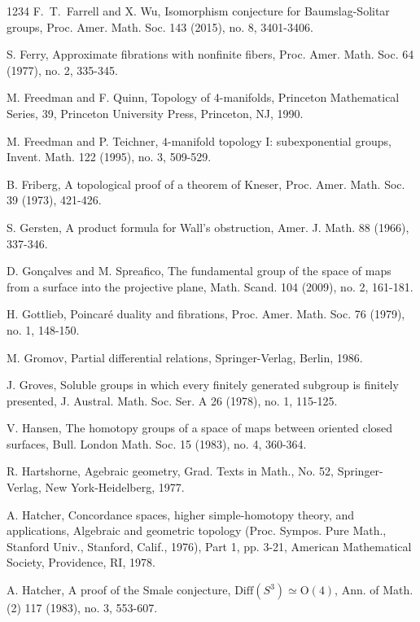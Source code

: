 \documentclass[12pt]{amsart}
\theoremstyle{plain}
\theoremstyle{definition}
\theoremstyle{question}
\theoremstyle{remark}
\theoremstyle{assumption}
\numberwithin{equation}{section}
\theoremstyle{bigthm}
\begin{document}
\begin{thebibliography}{1234}
 F.~T.~Farrell and X. Wu, Isomorphism conjecture for Baumslag-Solitar groups, Proc. Amer. Math. Soc. 143 (2015), no. 8, 3401-3406.

 S. Ferry, Approximate fibrations with nonfinite fibers, Proc. Amer. Math. Soc. 64 (1977), no. 2, 335-345.

 M. Freedman and F. Quinn, Topology of 4-manifolds, Princeton Mathematical Series, 39, Princeton University Press, Princeton, NJ, 1990.

 M. Freedman and P. Teichner, $4$-manifold topology I: subexponential groups, Invent. Math. 122 (1995), no. 3, 509-529.

 B. Friberg, A topological proof of a theorem of Kneser, Proc. Amer. Math. Soc. 39 (1973), 421-426.

 S. Gersten, A product formula for Wall's obstruction, Amer. J. Math. 88 (1966), 337-346.

 D. Gon\c{c}alves and M. Spreafico, The fundamental group of the space of maps from a surface into the projective plane, Math. Scand. 104 (2009), no. 2, 161-181.

 H. Gottlieb, Poincar\'{e} duality and fibrations, Proc. Amer. Math. Soc. 76 (1979), no. 1, 148-150.

 M. Gromov, Partial differential relations, Springer-Verlag, Berlin, 1986.

 J. Groves, Soluble groups in which every finitely generated subgroup is finitely presented, J. Austral. Math. Soc. Ser. A 26 (1978), no. 1, 115-125.

 V. Hansen, The homotopy groups of a space of maps between oriented closed surfaces, Bull. London Math. Soc. 15 (1983), no. 4, 360-364.

 R. Hartshorne, Agebraic geometry, Grad. Texts in Math., No. 52, Springer-Verlag, New York-Heidelberg, 1977.

 A. Hatcher, Concordance spaces, higher simple-homotopy theory, and applications, Algebraic and geometric topology (Proc. Sympos. Pure Math., Stanford Univ., Stanford, Calif., 1976), Part 1, pp. 3-21, American Mathematical Society, Providence, RI, 1978.

 A. Hatcher, A proof of the Smale conjecture, $\mathrm{Diff} (S^{3}) \simeq \mathrm{O}(4)$, Ann. of Math. (2) 117 (1983), no. 3, 553-607.


\end{thebibliography}
\end{document}
